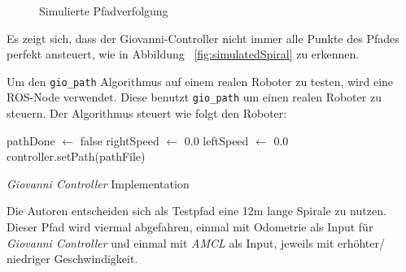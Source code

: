 \documentclass[11pt,a4paper]{article}
\begin{document}
{\begin{figure}[h]
{	}
	\caption{Simulierte Pfadverfolgung}

\end{figure}
Es zeigt sich, dass der Giovanni-Controller nicht immer alle Punkte des Pfades perfekt ansteuert, wie in Abbildung ~\ref{fig:simulatedSpiral} zu erkennen.  


\newpage
Um den \texttt{gio\_path} Algorithmus auf einem realen Roboter zu testen, wird eine ROS-Node verwendet. Diese benutzt  \texttt{gio\_path} um einen realen Roboter zu steuern. Der Algorithmus steuert wie folgt den Roboter: 

\begin{algorithm}
	pathDone $\leftarrow$ false\;
	rightSpeed $\leftarrow$ 0.0\;
	leftSpeed $\leftarrow$ 0.0\;
	controller.setPath(pathFile)\;
\caption{\textit{Giovanni Controller} Implementation}
\end{algorithm}

Die Autoren entscheiden sich als Testpfad eine 12m lange Spirale zu nutzen. Dieser Pfad wird viermal abgefahren, einmal mit Odometrie als Input f\"ur \textit{Giovanni Controller} und einmal mit \textit{AMCL} als Input, jeweils mit erh\"ohter/ niedriger Geschwindigkeit.

}
\end{document}
